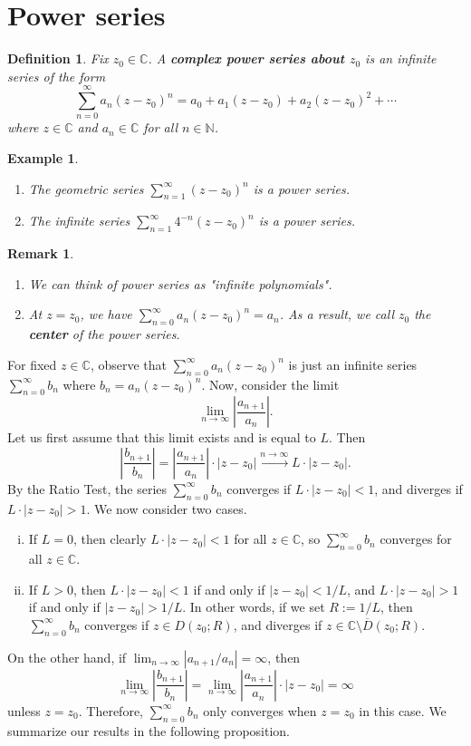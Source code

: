 \documentclass[10pt]{article}
\newcommand{\C}{\mathbb{C}}
\newcommand{\N}{\mathbb{N}}
\theoremstyle{newstyle}
\newtheorem{remark}[thm]{Remark}
\newtheorem{defn}[thm]{Definition}
\newtheorem{exmp}[thm]{Example}
\begin{document}
\newpage 
\section{Power series}

\begin{defn}
Fix $z_0 \in \C$. A {\bf complex power series about $z_0$} is an infinite series of the form 
\[ \sum_{n=0}^\infty a_n(z-z_0)^n = a_0 + a_1(z-z_0) + a_2(z-z_0)^2 + \cdots \] 
where $z \in \C$ and $a_n \in \C$ for all $n \in \N$. 
\end{defn}

\begin{exmp}~
\begin{enumerate}[(1)]
    \item The geometric series $\sum_{n=1}^\infty (z-z_0)^n$ is a power series.
    \item The infinite series $\sum_{n=1}^\infty 4^{-n}(z - z_0)^n$ is a power series. 
\end{enumerate}
\end{exmp}

\begin{remark}~
\begin{enumerate}[(1)]
    \item We can think of power series as "infinite polynomials". 
    \item At $z = z_0$, we have $\sum_{n=0}^\infty a_n (z-z_0)^n = a_n$. As a result, 
    we call $z_0$ the {\bf center} of the power series. 
\end{enumerate}
\end{remark}

For fixed $z \in \C$, observe that $\sum_{n=0}^\infty a_n(z-z_0)^n$ is just an infinite series 
$\sum_{n=0}^\infty b_n$ where $b_n = a_n(z-z_0)^n$. Now, consider the limit 
\[ \lim_{n\to\infty} \left| \frac{a_{n+1}}{a_n} \right|. \]
Let us first assume that this limit exists and is equal to $L$. Then 
\[ \left| \frac{b_{n+1}}{b_n} \right| = \left| \frac{a_{n+1}}{a_n} \right| \cdot |z - z_0| 
\xrightarrow[]{n\to\infty} L \cdot |z - z_0|. \]
By the Ratio Test, the series $\sum_{n=0}^\infty b_n$ converges if $L \cdot |z-z_0| < 1$, and 
diverges if $L \cdot |z-z_0| > 1$. We now consider two cases. 
\begin{enumerate}[(i)]
    \item If $L = 0$, then clearly $L \cdot |z-z_0| < 1$ for all $z \in \C$, so 
    $\sum_{n=0}^\infty b_n$ converges for all $z \in \C$. 
    \item If $L > 0$, then $L \cdot |z-z_0| < 1$ if and only if $|z-z_0| < 1/L$, and 
    $L \cdot |z-z_0| > 1$ if and only if $|z-z_0| > 1/L$. In other words, if we set 
    $R := 1/L$, then $\sum_{n=0}^\infty b_n$ converges if $z \in D(z_0; R)$, and 
    diverges if $z \in \C \setminus \overline{D}(z_0; R)$. 
\end{enumerate}
On the other hand, if $\lim_{n\to\infty} |a_{n+1}/a_n| = \infty$, then 
\[ \lim_{n\to\infty} \left| \frac{b_{n+1}}{b_n} \right| = 
\lim_{n\to\infty} \left| \frac{a_{n+1}}{a_n} \right| \cdot |z - z_0| = \infty \]
unless $z = z_0$. Therefore, $\sum_{n=0}^\infty b_n$ only converges when $z = z_0$ in this case. 
We summarize our results in the following proposition.
\end{document}
